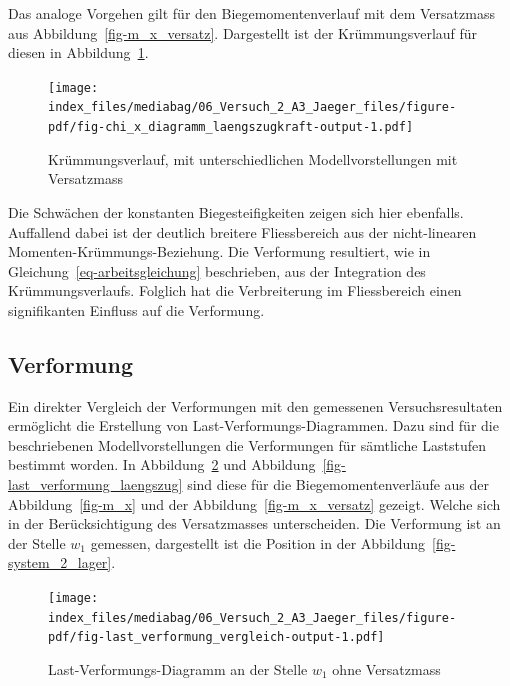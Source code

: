 \documentclass[
  12pt,
  letterpaper,
  egregdoesnotlikesansseriftitles]{scrreprt}
\begin{document}
Das analoge Vorgehen gilt für den Biegemomentenverlauf mit dem
Versatzmass aus Abbildung~\ref{fig-m_x_versatz}. Dargestellt ist der
Krümmungsverlauf für diesen in
Abbildung~\ref{fig-chi_x_diagramm_laengszugkraft}.

\begin{figure}[H]

{\centering \texttt{[image: index\_files/mediabag/06\_Versuch\_2\_A3\_Jaeger\_files/figure-pdf/fig-chi\_x\_diagramm\_laengszugkraft-output-1.pdf]}

}

\caption{\label{fig-chi_x_diagramm_laengszugkraft}Krümmungsverlauf, mit
unterschiedlichen Modellvorstellungen mit Versatzmass}

\end{figure}

Die Schwächen der konstanten Biegesteifigkeiten zeigen sich hier
ebenfalls. Auffallend dabei ist der deutlich breitere Fliessbereich aus
der nicht-linearen Momenten-Krümmungs-Beziehung. Die Verformung
resultiert, wie in Gleichung~\ref{eq-arbeitsgleichung} beschrieben, aus
der Integration des Krümmungsverlaufs. Folglich hat die Verbreiterung im
Fliessbereich einen signifikanten Einfluss auf die Verformung.

\hypertarget{verformung}{%
\subsection{Verformung}\label{verformung}}

Ein direkter Vergleich der Verformungen mit den gemessenen
Versuchsresultaten ermöglicht die Erstellung von
Last-Verformungs-Diagrammen. Dazu sind für die beschriebenen
Modellvorstellungen die Verformungen für sämtliche Laststufen bestimmt
worden. In Abbildung~\ref{fig-last_verformung_vergleich} und
Abbildung~\ref{fig-last_verformung_laengszug} sind diese für die
Biegemomentenverläufe aus der Abbildung~\ref{fig-m_x} und der
Abbildung~\ref{fig-m_x_versatz} gezeigt. Welche sich in der
Berücksichtigung des Versatzmasses unterscheiden. Die Verformung ist an
der Stelle \(w_1\) gemessen, dargestellt ist die Position in der
Abbildung~\ref{fig-system_2_lager}.

\begin{figure}[H]

{\centering \texttt{[image: index\_files/mediabag/06\_Versuch\_2\_A3\_Jaeger\_files/figure-pdf/fig-last\_verformung\_vergleich-output-1.pdf]}

}

\caption{\label{fig-last_verformung_vergleich}Last-Verformungs-Diagramm
an der Stelle \(w_1\) ohne Versatzmass}

\end{figure}
\end{document}
